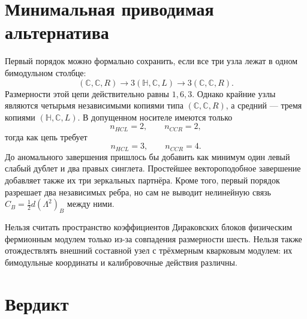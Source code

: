 \section{Минимальная приводимая альтернатива}

Первый порядок можно формально сохранить, если все три узла лежат в одном
бимодульном столбце:
\begin{equation}
 (\mathbb C,\mathbb C,R)
 \longrightarrow
 3(\mathbb H,\mathbb C,L)
 \longrightarrow
 3(\mathbb C,\mathbb C,R).
 \label{eq:v7-coherence-bimodule-reducible-chain}
\end{equation}
Размерности этой цепи действительно равны $1,6,3$. Однако крайние узлы
являются четырьмя независимыми копиями типа $(\mathbb C,\mathbb C,R)$,
а средний --- тремя копиями $(\mathbb H,\mathbb C,L)$. В допущенном
носителе имеются только
\begin{equation}
 n_{HCL}=2,\qquad n_{CCR}=2,
 \label{eq:v7-coherence-bimodule-available-multiplicities}
\end{equation}
тогда как цепь требует
\begin{equation}
 n_{HCL}=3,\qquad n_{CCR}=4.
 \label{eq:v7-coherence-bimodule-required-multiplicities}
\end{equation}
До аномального завершения пришлось бы добавить как минимум один левый
слабый дублет и два правых синглета. Простейшее вектороподобное завершение
добавляет также их три зеркальных партнёра. Кроме того, первый порядок
разрешает два независимых ребра, но сам не выводит нелинейную связь
$C_B=\frac12d(\Lambda^2)_B$ между ними.

\begin{nogocriterion}
Нельзя считать пространство коэффициентов Дираковских блоков физическим
фермионным модулем только из-за совпадения размерности шесть. Нельзя также
отождествлять внешний составной узел с трёхмерным кварковым модулем:
их бимодульные координаты и калибровочные действия различны.
\end{nogocriterion}

\section{Вердикт}

